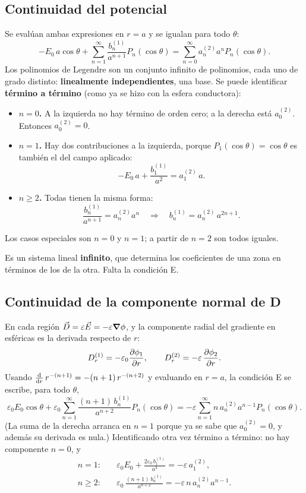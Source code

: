 \documentclass[12pt,a4paper]{article}
\begin{document}
\subsection{Continuidad del potencial}

Se evalúan ambas expresiones en $r=a$ y se igualan para todo $\theta$:
\[
-E_0\, a\cos\theta + \sum_{n=1}^{\infty} \frac{b_n^{(1)}}{a^{n+1}} P_n(\cos\theta)
= \sum_{n=0}^{\infty} a_n^{(2)} a^{n} P_n(\cos\theta).
\]
Los polinomios de Legendre son un conjunto infinito de polinomios, cada uno de
grado distinto: \textbf{linealmente independientes}, una base. Se puede
identificar \textbf{término a término} (como ya se hizo con la esfera conductora):
\begin{itemize}
  \item \textbf{$n=0$.} A la izquierda no hay término de orden cero; a la derecha
    está $a_0^{(2)}$. Entonces $a_0^{(2)} = 0$.
  \item \textbf{$n=1$.} Hay dos contribuciones a la izquierda, porque
    $P_1(\cos\theta) = \cos\theta$ es también el del campo aplicado:
    \[
    -E_0\, a + \frac{b_1^{(1)}}{a^2} = a_1^{(2)}\, a .
    \]
  \item \textbf{$n\ge 2$.} Todas tienen la misma forma:
    \[
    \frac{b_n^{(1)}}{a^{n+1}} = a_n^{(2)} a^n
    \quad\Longrightarrow\quad
    b_n^{(1)} = a_n^{(2)}\, a^{2n+1}.
    \]
\end{itemize}
Los casos especiales son $n=0$ y $n=1$; a partir de $n=2$ son todos iguales.

\begin{notebox}
Es un sistema lineal \textbf{infinito}, que determina los coeficientes de una
zona en términos de los de la otra. Falta la condición E.
\end{notebox}

\subsection{Continuidad de la componente normal de D}

En cada región $\vec D = \varepsilon\vec E = -\varepsilon\grad\phi$, y la
componente radial del gradiente en esféricas es la derivada respecto de $r$:
\[
D_r^{(1)} = -\varepsilon_0 \pdv{\phi_1}{r},
\qquad
D_r^{(2)} = -\varepsilon\, \pdv{\phi_2}{r}.
\]
Usando $\dv{r}\, r^{-(n+1)} = -(n+1)\, r^{-(n+2)}$ y evaluando en $r=a$, la
condición E se escribe, para todo $\theta$,
\[
\varepsilon_0 E_0\cos\theta
+ \varepsilon_0 \sum_{n=1}^{\infty} \frac{(n+1)\, b_n^{(1)}}{a^{n+2}} P_n(\cos\theta)
= -\varepsilon \sum_{n=1}^{\infty} n\, a_n^{(2)} a^{n-1} P_n(\cos\theta).
\]
(La suma de la derecha arranca en $n=1$ porque ya se sabe que $a_0^{(2)}=0$, y
además su derivada es nula.) Identificando otra vez término a término: no hay
componente $n=0$, y
\begin{align*}
n=1:&\quad \varepsilon_0 E_0 + \frac{2\varepsilon_0\, b_1^{(1)}}{a^3}
= -\varepsilon\, a_1^{(2)},\\
n\ge 2:&\quad \varepsilon_0\,\frac{(n+1)\, b_n^{(1)}}{a^{n+2}}
= -\varepsilon\, n\, a_n^{(2)} a^{n-1}.
\end{align*}
\end{document}

